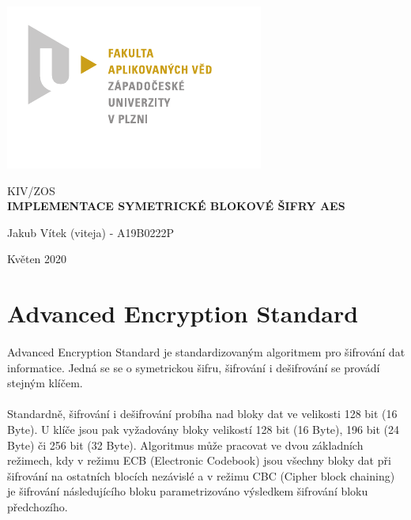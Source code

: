 \documentclass[12pt, a4paper]{article}
\begin{document}
\graphicspath{ {img/} }

\thispagestyle{empty}
\begin{center}
\begin{minipage}{0.75\linewidth}
    \centering
    \vspace{3cm}
    \includegraphics[width=0.75\linewidth]{fav-logo.pdf}\\
    \vspace{0.5cm}
    {\Large KIV/ZOS \\ \textbf{IMPLEMENTACE SYMETRICKÉ BLOKOVÉ ŠIFRY AES}\par}
    \vspace{4cm}
    {\Large Jakub Vítek (viteja) - A19B0222P\par}
    \vspace{2cm}
    \vspace{2cm}
    {\Large Květen 2020}
\end{minipage}
\end{center}
\clearpage
\newpage

\tableofcontents
\newpage

\shorthandoff{-}

\shorthandon{-}


\section{Advanced Encryption Standard}
\paragraph{}
Advanced Encryption Standard je standardizovaným algoritmem pro šifrování dat informatice. Jedná se
se o symetrickou šifru, šifrování i dešifrování se provádí stejným klíčem.
\paragraph{}
Standardně, šifrování i dešifrování probíha nad bloky dat ve velikosti 128 bit (16 Byte). U klíče jsou pak vyžadovány
bloky velikostí 128 bit (16 Byte), 196 bit (24 Byte) či 256 bit (32 Byte). Algoritmus může pracovat ve dvou
základních režimech, kdy v režimu ECB (Electronic Codebook) jsou všechny bloky dat při šifrování na ostatních
blocích nezávislé a v režimu CBC (Cipher block chaining) je šifrování následujícího bloku parametrizováno výsledkem
šifrování bloku předchozího.
\end{document}
